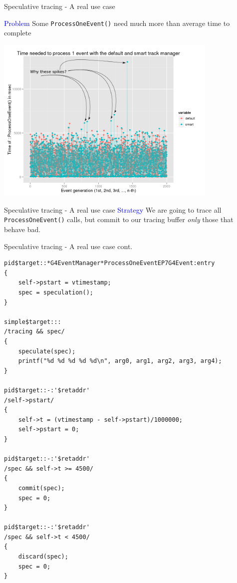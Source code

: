 \documentclass{beamer}
\begin{document}
\begin{frame}{Speculative tracing - A real use case}

\textcolor{blue}{Problem} Some {\tt ProcessOneEvent()} need much more than
average time to complete

\begin{center}
  \includegraphics[width=0.8\textwidth]{evts1-arrows.png}
\end{center}
\end{frame}

\begin{frame}{Speculative tracing - A real use case}
\textcolor{blue}{Strategy} We are going to trace all {\tt ProcessOneEvent()} calls, but commit to our tracing
buffer \textit{only} those that behave bad.
\end{frame}

\begin{frame}[fragile]{Speculative tracing - A real use case cont.}
\lstset{basicstyle=\tiny\ttfamily}
\lstset{frame=single, columns=flexible}
\begin{lstlisting}
pid$target::*G4EventManager*ProcessOneEventEP7G4Event:entry
{
    self->pstart = vtimestamp;
    spec = speculation();
}

simple$target:::
/tracing && spec/
{
    speculate(spec);
    printf("%d %d %d %d %d\n", arg0, arg1, arg2, arg3, arg4);
}

pid$target::-:'$retaddr'
/self->pstart/
{
    self->t = (vtimestamp - self->pstart)/1000000;
    self->pstart = 0;
}

pid$target::-:'$retaddr'
/spec && self->t >= 4500/
{
    commit(spec);
    spec = 0;
}

pid$target::-:'$retaddr'
/spec && self->t < 4500/
{
    discard(spec);
    spec = 0;
}
\end{lstlisting}
\end{frame}
\end{document}
